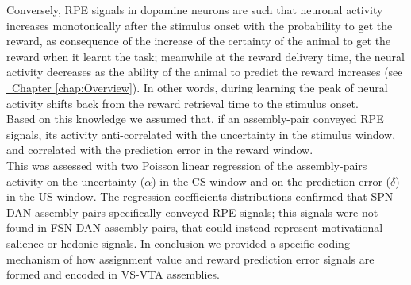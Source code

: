 \begin{itemize}
    Conversely, RPE signals in dopamine neurons are such that neuronal activity increases monotonically after the stimulus onset with the probability to get the reward, as consequence of the increase of the certainty of the animal to get the reward when it learnt the task; meanwhile at the reward delivery time, the neural activity decreases as the ability of the animal to predict the reward increases (see \hyperref[chap:Overview]{~Chapter \ref*{chap:Overview}}). In other words, during learning the peak of neural activity shifts back from the reward retrieval time to the stimulus onset.\\Based on this knowledge we assumed that, if an assembly-pair conveyed RPE signals, its activity anti-correlated with the uncertainty in the stimulus window, and correlated with the prediction error in the reward window.\\This was assessed with two Poisson linear regression of the assembly-pairs activity on the uncertainty ($\alpha$) in the CS window and on the prediction error ($\delta$) in the US window. The regression coefficients distributions confirmed that SPN-DAN assembly-pairs specifically conveyed RPE signals; this signals were not found in FSN-DAN assembly-pairs, that could instead represent motivational salience or hedonic signals. In conclusion we provided a specific coding mechanism of how assignment value and reward prediction error signals are formed and encoded in VS-VTA assemblies. 
\end{itemize}
  